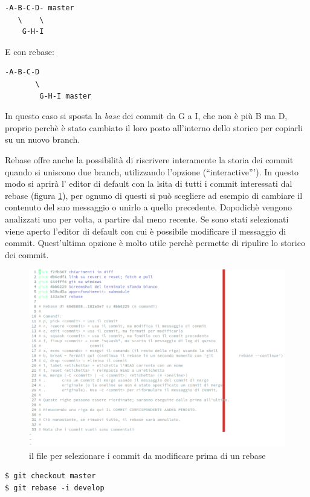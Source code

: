 \documentclass{article}
\begin{document}
\begin{verbatim}
-A-B-C-D- master
   \    \ 
    G-H-I
\end{verbatim}

E con rebase:

\begin{verbatim}
-A-B-C-D
       \
        G-H-I master
\end{verbatim}

In questo caso si sposta la \emph{base} dei commit da G a I, che non è più B ma
D, proprio perchè è stato cambiato il loro posto all'interno dello storico
per copiarli su un nuovo branch.

Rebase offre anche la possibilità di riscrivere interamente la storia dei commit
quando si uniscono due branch, utilizzando l'opzione
\code{-i} (``interactive''').
In questo modo si aprirà l' editor di default con la lsita di tutti i commit
interessati dal rebase (figura \ref{rebaseImg}), per ognuno di questi si può scegliere ad esempio di
cambiare il contenuto del suo messaggio o unirlo a quello precedente. Dopodichè
vengono analizzati uno per volta, a partire dal meno recente. Se sono stati
selezionati viene aperto l'editor di default con cui è possibile modificare il
messaggio di commit.
Quest'ultima opzione è molto utile perchè permette di ripulire lo storico dei 
commit.

\begin{figure}
\includegraphics[width=6in]{img/rebase.png}
\centering
\caption{il file per selezionare i commit da modificare prima di un
rebase\label{rebaseImg}}
\end{figure}

\begin{verbatim}
$ git checkout master
$ git rebase -i develop
\end{verbatim}
\end{document}
